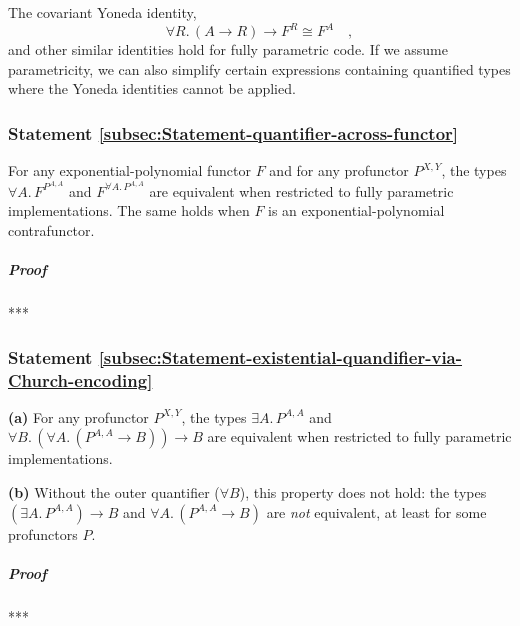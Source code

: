 The covariant Yoneda identity,
\[
\forall R.\,(A\rightarrow R)\rightarrow F^{R}\cong F^{A}\quad,
\]
and other similar identities hold for fully parametric code. If we
assume parametricity, we can also simplify certain expressions containing
quantified types where the Yoneda identities cannot be applied.

\subsubsection{Statement \label{subsec:Statement-quantifier-across-functor}\ref{subsec:Statement-quantifier-across-functor}}

For any exponential-polynomial functor $F$ and for any profunctor
$P^{X,Y}$, the types $\forall A.\,F^{P^{A,A}}$ and $F^{\forall A.\,P^{A,A}}$
are equivalent when restricted to fully parametric implementations.
The same holds when $F$ is an exponential-polynomial contrafunctor.

\subparagraph{Proof}

{*}{*}{*}

\subsubsection{Statement \label{subsec:Statement-existential-quandifier-via-Church-encoding}\ref{subsec:Statement-existential-quandifier-via-Church-encoding}}

\textbf{(a)} For any profunctor $P^{X,Y}$, the types $\exists A.\,P^{A,A}$
and $\forall B.\,(\forall A.\,(P^{A,A}\rightarrow B))\rightarrow B$
are equivalent when restricted to fully parametric implementations.

\textbf{(b)} Without the outer quantifier ($\forall B$), this property
does not hold: the types $(\exists A.\,P^{A,A})\rightarrow B$ and
$\forall A.\,(P^{A,A}\rightarrow B)$ are \emph{not} equivalent, at
least for some profunctors $P$.

\subparagraph{Proof}

{*}{*}{*}

